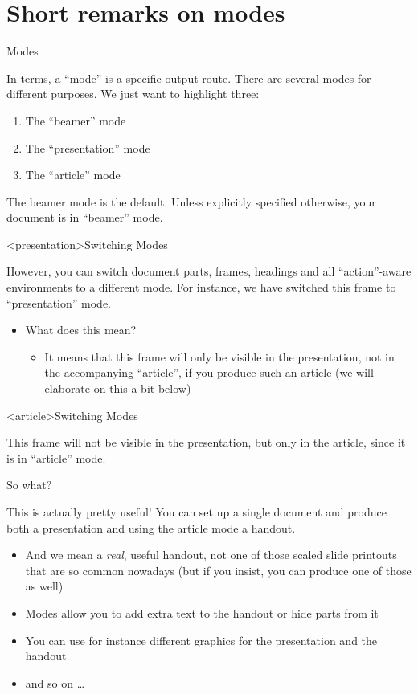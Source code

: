 \documentclass[english]{beamer}
\begin{document}
\section{Short remarks on modes}
\begin{frame}{Modes}

In  terms, a ``mode'' is a specific output route.
There are several modes for different purposes. We just want to highlight
three:
\begin{enumerate}
\item The ``beamer'' mode
\item The ``presentation'' mode
\item The ``article'' mode
\end{enumerate}
The beamer mode is the default. Unless explicitly specified otherwise,
your  document is in ``beamer'' mode.
\end{frame}
%
\begin{frame}<presentation>{Switching Modes}

However, you can switch document parts, frames, headings and all ``action''-aware
environments to a different mode. For instance, we have switched this
frame to ``presentation'' mode.
\begin{itemize}
\item What does this mean?
\begin{itemize}
\item It means that this frame will only be visible in the presentation,
not in the accompanying ``article'', if you produce such an article
(we will elaborate on this a bit below)
\end{itemize}
\end{itemize}
\end{frame}
%
\begin{frame}<article>{Switching Modes}

This frame will not be visible in the presentation, but only in the
article, since it is in ``article'' mode.
\end{frame}
%
\begin{frame}{So what?}

This is actually pretty useful! You can set up a single document and
produce both a presentation and \textendash{} using the article mode
\textendash{} a handout. 
\begin{itemize}
\item And we mean a \emph{real}, useful handout, not one of those scaled
slide printouts that are so common nowadays (but if you insist, you
can produce one of those as well)
\item Modes allow you to add extra text to the handout or hide parts from
it
\item You can use for instance different graphics for the presentation and
the handout
\item and so on \ldots{}
\end{itemize}
\end{frame}
\end{document}
